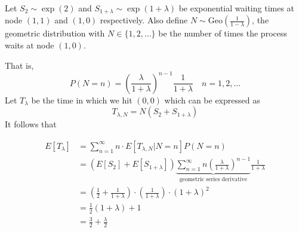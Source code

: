 \documentclass{article}
\theoremstyle{plain}
\theoremstyle{definition}
\theoremstyle{remark}
\begin{document}
Let $S_2 \sim \exp(2)$ and $S_{1 + \lambda} \sim \exp(1 + \lambda)$ be exponential waiting times at node $(1,1)$ and $(1,0)$ respectively.
Also define $N \sim \text{Geo}(\frac{1}{1 - \lambda})$, the geometric distribution with $N \in \{1,2,\ldots\}$ be the number of times the process waits at node $(1,0)$.

That is,
$$
P(N = n) = \left(\frac{\lambda}{1 + \lambda} \right)^{n - 1} \frac{1}{1 + \lambda} \quad n = 1,2,\ldots
$$
Let $T_\lambda$ be the time in which we hit $(0,0)$ which can be expressed as
$$
T_{\lambda, N} = N (S_2 + S_{1 + \lambda})
$$
It follows that

\begin{align*}
    E[T_\lambda] &= \sum_{n = 1}^\infty n \cdot E[T_{\lambda, N} | N = n] P(N = n)\\
    &= (E[S_2] + E[S_{1 + \lambda}]) \underbrace{\sum_{n = 1}^\infty n \left(\frac{\lambda}{1 + \lambda} \right)^{n - 1}}_{\text{geometric series derivative}} \frac{1}{1 + \lambda}\\
    &= \left(\frac{1}{2} + \frac{1}{1 + \lambda} \right) \cdot \left( \frac{1}{1 + \lambda} \right) \cdot (1 + \lambda)^2\\
    &= \frac{1}{2}(1 + \lambda) + 1\\
    &= \frac{3}{2} + \frac{\lambda}{2}
\end{align*}

\end{document}

